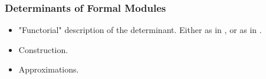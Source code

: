 \subsubsection{Determinants of Formal Modules} %
\label{ssub:Determinants of Formal Modules}
\begin{itemize}
  \item "Functorial" description of the determinant. Either as in
    \cite{BoyarchenkoWeinstein2011MaxVar}, or as in \cite{weinstein2016semistable}.
  \item Construction.
  \item Approximations.
\end{itemize}

